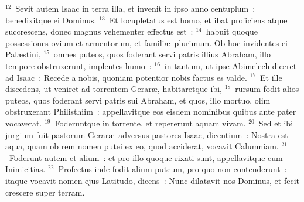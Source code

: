 ${}^{12}$~Sevit autem Isaac in terra illa, et invenit in ipso anno centuplum~: benedixitque ei Dominus.
${}^{13}$~Et locupletatus est homo, et ibat proficiens atque succrescens, donec magnus vehementer effectus est~:
${}^{14}$~habuit quoque possessiones ovium et armentorum, et famili\ae\ plurimum. Ob hoc invidentes ei Pal\ae stini,
${}^{15}$~omnes puteos, quos foderant servi patris illius Abraham, illo tempore obstruxerunt, implentes humo~:
${}^{16}$~in tantum, ut ipse Abimelech diceret ad Isaac~: Recede a nobis, quoniam potentior nobis factus es valde.
${}^{17}$~Et ille discedens, ut veniret ad torrentem Gerar\ae , habitaretque ibi,
${}^{18}$~rursum fodit alios puteos, quos foderant servi patris sui Abraham, et quos, illo mortuo, olim obstruxerant Philisthiim~: appellavitque eos eisdem nominibus quibus ante pater vocaverat.
${}^{19}$~Foderuntque in torrente, et repererunt aquam vivam.
${}^{20}$~Sed et ibi jurgium fuit pastorum Gerar\ae\ adversus pastores Isaac, dicentium~: Nostra est aqua, quam ob rem nomen putei ex eo, quod acciderat, vocavit Calumniam.
${}^{21}$~Foderunt autem et alium~: et pro illo quoque rixati sunt, appellavitque eum Inimicitias.
${}^{22}$~Profectus inde fodit alium puteum, pro quo non contenderunt~: itaque vocavit nomen ejus Latitudo, dicens~: Nunc dilatavit nos Dominus, et fecit crescere super terram.


